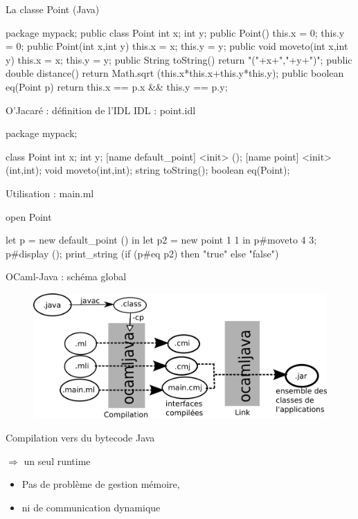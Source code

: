\documentclass[xcolor={table,dvipsnames}]{beamer}
\begin{document}
\begin{frame}[fragile]{La classe Point (Java)}

\bigskip

\begin{javaEx} 
  package mypack;
  public class Point {
    int x;
    int y;
    public Point() { 
      this.x = 0;
      this.y = 0;
    }
    public Point(int x,int y) {
      this.x = x;
      this.y = y;
    }
    public void moveto(int x,int y){
      this.x = x;
      this.y = y;
    }
    public String toString() {
      return "("+x+","+y+")";
    }
    public double distance() {
      return Math.sqrt (this.x*this.x+this.y*this.y);
    }
    public boolean eq(Point p) {
      return this.x == p.x  && this.y == p.y;
    }
  }
\end{javaEx}

\end{frame}





\begin{frame}[fragile]{O'Jacaré : définition de l'IDL}
  IDL : point.idl
\begin{idlEx} 
package mypack;

class Point {
  int x;
  int y; 
  [name default_point] <init> ();
  [name point] <init> (int,int);
  void moveto(int,int);
  string toString();
  boolean eq(Point);
}
\end{idlEx}

Utilisation : main.ml
\begin{OCamlEx}
  open Point

  let p = new default_point () in
  let p2 = new point 1 1 in
  p#moveto 4 3;
  p#display ();
  print_string (if (p#eq p2) then "true" else "false")
\end{OCamlEx}
\end{frame}




\begin{frame}{OCaml-Java : schéma global}
\begin{figure}[h!]
  \centering
  \includegraphics[scale=0.8]{schemaOCamlJava.png}
\end{figure}
Compilation vers du bytecode Java

$\Rightarrow$ un seul runtime
\begin{itemize}
\item Pas de problème de gestion mémoire, 
\item ni de communication dynamique
\end{itemize}
\end{frame}
\end{document}
